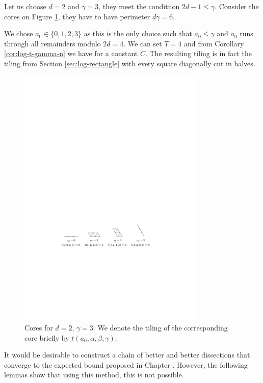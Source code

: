 \begin{exmp}
Let us choose $d=2$ and $\gamma=3$, they meet the conditiion $2d-1 \leq \gamma$. Consider the cores on Figure \ref{fig:core-kk3}, they have to have perimeter $d\gamma = 6$.

We chose $a_0 \in \{0,1,2,3\}$ as this is the only choice such that $a_0 \leq \gamma$ and $a_0$ runs through all remainders modulo $2d=4$. We can set $T=4$ and from Corollary \ref{cor:log-t-gamma-n} we have
for a constant $C$. The resulting tiling is in fact the tiling from Section \ref{sec:log-rectangle}  with every square diagonally cut in halves.

\begin{figure}[htb]
\centering
\includegraphics[width=0.8\textwidth]{img/example_core_kk3.pdf}
\caption{Cores for $d=2$, $\gamma=3$. We denote the tiling of the corresponding core briefly by $t(a_0,\alpha,\beta,\gamma)$.}
\label{fig:core-kk3}
\end{figure}
\end{exmp}%

It would be desirable to construct a chain of better and better dissections that converge to the expected bound proposed in Chapter . However, the following lemmas show that using this method, this is not possible.

